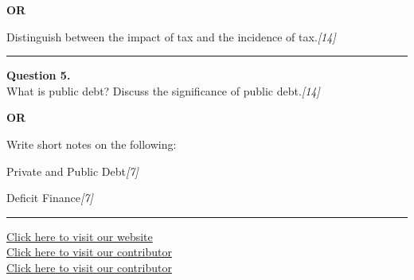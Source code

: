 \documentclass[11pt,a4paper]{article}
\newcommand{\pts}[1]{\hfill   \textit{[#1]}}
\begin{document}
\centerline{   \textbf{OR}}

Distinguish between the impact of tax and the incidence of tax.\pts{14}

\medskip\rule{\linewidth}{0.2pt}




\noindent   \textbf{Question 5.} \\
What is public debt? Discuss the significance of public debt.\pts{14}

\centerline{   \textbf{OR}}

Write short notes on the following:

\begin{parts}
  \item Private and Public Debt\pts{7}
  \item Deficit Finance\pts{7}
\end{parts}

\vfill
\rule{\linewidth}{0.4pt}

\begin{center}\small
\href{https://bhu-exam.vercel.app/}{Click here to visit our website}\\[4pt]
\href{https://me-aryan.vercel.app/}{Click here to visit our contributor}\\[4pt]
\href{https://quashan-me.vercel.app/}{Click here to visit our contributor}
\end{center}
\end{document}
